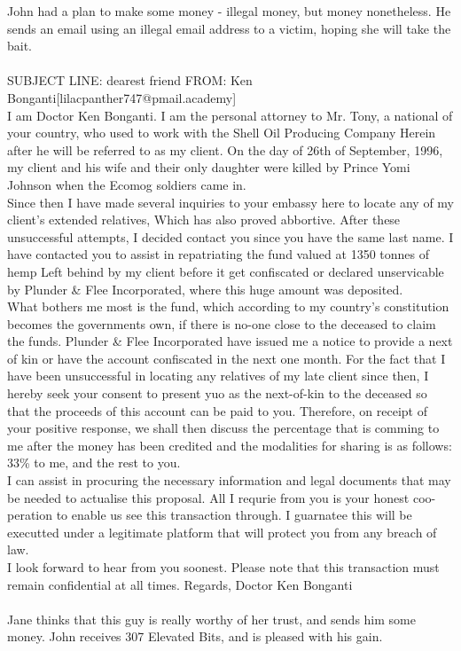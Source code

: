 \documentclass{article}
\begin{document}
John had a plan to make some money {-} illegal money, but money nonetheless.
He sends an email using an illegal email address to a victim, hoping she will take the bait.
\\\\
SUBJECT LINE: dearest friend
FROM: Ken Bonganti[lilacpanther747@pmail.academy]
\\
I am Doctor Ken Bonganti.
I am the personal attorney to Mr. Tony, a national of your country, who used to work with the Shell Oil Producing Company
Herein after he will be referred to as my client.
On the day of 26th of September, 1996, my client and his wife and their only daughter were killed by Prince Yomi Johnson when the Ecomog soldiers came in.
\\
Since then I have made several inquiries to your embassy here to locate any of my client's extended relatives, Which has also proved abbortive.
After these unsuccessful attempts, I decided contact you since you have the same last name.
I have contacted you to assist in repatriating the fund valued at 1350 tonnes of hemp Left behind by my client before it get confiscated or declared unservicable by Plunder \& Flee Incorporated, where this huge amount was deposited.
\\
What bothers me most is the fund, which according to my country's constitution becomes the governments own, if there is no{-}one close to the deceased to claim the funds.
Plunder \& Flee Incorporated have issued me a notice to provide a next of kin or have the account confiscated in the next one month.
For the fact that I have been unsuccessful in locating any relatives of my late client since then, I hereby seek your consent to present yuo as the next{-}of{-}kin to the deceased so that the proceeds of this account can be paid to you.
Therefore, on receipt of your positive response, we shall then discuss the percentage that is comming to me after the money has been credited and the modalities for sharing is as follows: 33\% to me, and the rest to you.
\\
I can assist in procuring the necessary information and legal documents that may be needed to actualise this proposal.
All I requrie from you is your honest coo{-}peration to enable us see this transaction through.
I guarnatee this will be executted under a legitimate platform that will protect you from any breach of law.
\\
I look forward to hear from you soonest.
Please note that this transaction must remain confidential at all times.
Regards, Doctor Ken Bonganti
\\\\
Jane thinks that this guy is really worthy of her trust, and sends him some money.
John receives 307 Elevated Bits, and is pleased with his gain.
\end{document}
